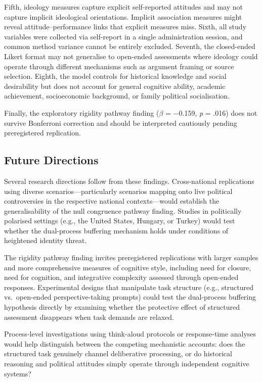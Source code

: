 \documentclass[referee,pdflatex,sn-apa]{sn-jnl}
\begin{document}
Fifth, ideology measures capture explicit self-reported attitudes and may not capture implicit ideological orientations. Implicit association measures might reveal attitude--performance links that explicit measures miss. Sixth, all study variables were collected via self-report in a single administration session, and common method variance cannot be entirely excluded. Seventh, the closed-ended Likert format may not generalise to open-ended assessments where ideology could operate through different mechanisms such as argument framing or source selection. Eighth, the model controls for historical knowledge and social desirability but does not account for general cognitive ability, academic achievement, socioeconomic background, or family political socialisation.

Finally, the exploratory rigidity pathway finding ($\beta$ = $-$0.159, \textit{p} = .016) does not survive Bonferroni correction and should be interpreted cautiously pending preregistered replication.

\subsection{Future Directions}\label{subsec:future}

Several research directions follow from these findings. Cross-national replications using diverse scenarios---particularly scenarios mapping onto live political controversies in the respective national contexts---would establish the generalisability of the null congruence pathway finding. Studies in politically polarised settings (e.g., the United States, Hungary, or Turkey) would test whether the dual-process buffering mechanism holds under conditions of heightened identity threat.

The rigidity pathway finding invites preregistered replications with larger samples and more comprehensive measures of cognitive style, including need for closure, need for cognition, and integrative complexity assessed through open-ended responses. Experimental designs that manipulate task structure (e.g., structured vs.\ open-ended perspective-taking prompts) could test the dual-process buffering hypothesis directly by examining whether the protective effect of structured assessment disappears when task demands are relaxed.

Process-level investigations using think-aloud protocols or response-time analyses would help distinguish between the competing mechanistic accounts: does the structured task genuinely channel deliberative processing, or do historical reasoning and political attitudes simply operate through independent cognitive systems?
\end{document}
